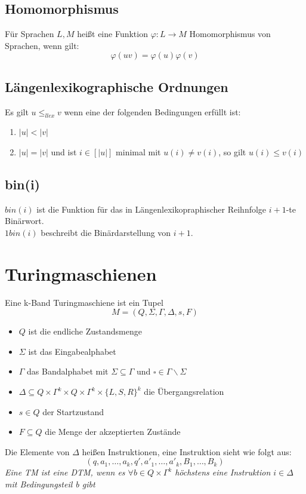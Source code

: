 \documentclass[DIV=15]{scrartcl}
\begin{document}
    \subsection{Homomorphismus}
        Für Sprachen \(L,M\) heißt eine Funktion \(\varphi:L\to M\) 
        Homomorphismus von Sprachen, wenn gilt: \[\varphi(uv) = \varphi(u)\varphi(v)\]
    \subsection{Längenlexikographische Ordnungen}
        Es gilt \(u \leq_{llex} v\) wenn eine der folgenden Bedingungen erfüllt ist:
        \begin{enumerate}
            \item \(|u|<|v|\)
            \item \(|u|=|v|\) und ist \(i\in[|u|]\) minimal mit \(u(i)\ne v(i)\), so gilt \(u(i)\leq v(i)\)
        \end{enumerate}
    \subsection{bin(i)}
    \(bin(i)\) ist die Funktion für das in Längenlexikopraphischer Reihnfolge \(i+1\)-te Binärwort.\\
    \(1bin(i)\) beschreibt die Binärdarstellung von \(i+1\).
\newpage
\section{Turingmaschienen} 
    Eine k-Band Turingmaschiene ist ein Tupel \[M=(Q,\Sigma,\Gamma,\Delta,s,F)\]
    \begin{itemize}
        \item \(Q\) ist die endliche Zustandsmenge
        \item \(\Sigma\) ist das Eingabealphabet
        \item \(\Gamma\) das Bandalphabet mit \(\Sigma\subseteq\Gamma\) und \(\square\in\Gamma\backslash\Sigma\)
        \item \(\Delta\subseteq Q\times\Gamma^k\times Q\times\Gamma^k\times {\{L,S,R\}}^k\) die Übergangsrelation
        \item \(s\in Q\) der Startzustand
        \item \(F\subseteq Q\) die Menge der akzeptierten Zustände
    \end{itemize}
    Die Elemente von \(\Delta\) heißen Instruktionen, eine Instruktion sieht wie folgt aus:
    \[(q,a_1,\dots,a_k,q',a'_1,\dots,a'_k,B_1,\dots,B_k)\]
    \textit{Eine TM ist eine DTM, wenn es \(\forall b\in Q\times\Gamma^k\) höchstens eine Instruktion \(i\in \Delta\) mit Bedingungsteil b gibt}
\end{document}
